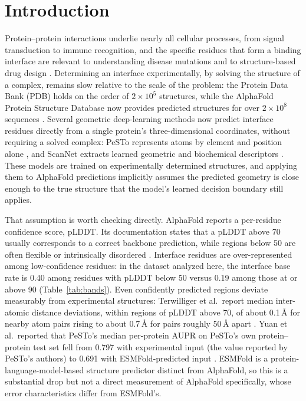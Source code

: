 \documentclass[10pt]{article}
\begin{document}
\section{Introduction}

Protein--protein interactions underlie nearly all cellular processes, from
signal transduction to immune recognition, and the specific residues that form
a binding interface are relevant to understanding disease mutations and to
structure-based drug design \cite{zhang2024}. Determining an interface
experimentally, by solving the structure of a complex, remains slow relative to
the scale of the problem: the Protein Data Bank (PDB) holds on the order of
$2\times10^5$ structures, while the AlphaFold Protein Structure Database now
provides predicted structures for over $2\times10^8$ sequences
\cite{jumper2021,varadi2024}. Several geometric deep-learning methods now
predict interface residues directly from a single protein's three-dimensional
coordinates, without requiring a solved complex: PeSTo represents atoms by
element and position alone \cite{krapp2023}, and ScanNet extracts learned
geometric and biochemical descriptors \cite{tubiana2022}. These models are
trained on experimentally determined structures, and applying them to
AlphaFold predictions implicitly assumes the predicted geometry is close
enough to the true structure that the model's learned decision boundary still
applies.

That assumption is worth checking directly. AlphaFold reports a per-residue
confidence score, pLDDT. Its documentation states that a pLDDT above 70
usually corresponds to a correct backbone prediction, while regions below 50
are often flexible or intrinsically disordered \cite{afdbplddt}. Interface
residues are over-represented among low-confidence residues: in the dataset
analyzed here, the interface base rate is 0.40 among residues
with pLDDT below 50 versus 0.19 among those at or above 90
(Table~\ref{tab:bands}). Even confidently predicted regions deviate
measurably from experimental structures: Terwilliger et al.\ report median
inter-atomic distance deviations, within regions of pLDDT above 70, of about
0.1\,\r{A} for nearby atom pairs rising to about 0.7\,\r{A} for pairs
roughly 50\,\r{A} apart \cite{terwilliger2024}. Yuan et al.\ reported that
PeSTo's median per-protein AUPR on PeSTo's own protein--protein test set fell
from 0.797 with experimental input (the value reported by PeSTo's authors)
to 0.691 with ESMFold-predicted input \cite{yuan2024,lin2023}. ESMFold is a
protein-language-model-based structure predictor distinct from AlphaFold,
so this is a substantial drop but not a direct measurement of AlphaFold
specifically, whose error characteristics differ from ESMFold's.
\end{document}
